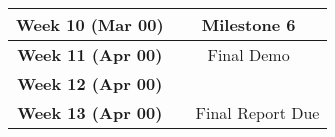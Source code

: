 \documentclass[11pt]{article}
\begin{document}
\begin{center}
\begin{tabular}{|c|c|c|c|}
    \hline
    \textbf{Week 10 (Mar 00)} & & Milestone 6 & \\
    
    \hline
    \textbf{Week 11 (Apr 00)} & & Final Demo & \\
    
    \hline
    \textbf{Week 12 (Apr 00)} & & & \\
    
    \hline
    \textbf{Week 13 (Apr 00)} & & \multicolumn{2}{c|}{Final Report Due} \\
    
    \hline
\end{tabular}

\end{center}



\end{document}
